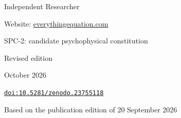 \newtheorem{definition}[theorem]{Definition}
\newtheorem{assumption}[theorem]{Assumption}
\newtheorem{example}[theorem]{Example}
\newtheorem{constitution}[theorem]{Constitutive law}
\theoremstyle{remark}
\newtheorem{remark}[theorem]{Remark}
\newcommand{\R}{\mathbb R}
\newcommand{\C}{\mathbb C}
\newcommand{\N}{\mathbb N}
\newcommand{\E}{\mathbb E}
\newcommand{\HH}{\mathcal H}
\newcommand{\BB}{\mathcal B}
\newcommand{\PP}{\mathcal P}
\newcommand{\ZZ}{\mathcal Z}
\newcommand{\id}{\mathrm{id}}
\newcommand{\dd}{\,\mathrm d}
\newcommand{\TV}{d_{\mathrm{TV}}}
\newcommand{\tr}{\operatorname{tr}}
\newcommand{\supp}{\operatorname{supp}}
\newcommand{\rank}{\operatorname{rank}}
\newcommand{\im}{\operatorname{im}}
\newcommand{\Fix}{\operatorname{Fix}}
\newcommand{\Spec}{\operatorname{Spec}}
\newcommand{\Law}{\operatorname{Law}}
\newcommand{\Var}{\operatorname{Var}}
\newcommand{\osc}{\operatorname{osc}}
\newcommand{\diag}{\operatorname{diag}}
\newcommand{\Span}{\operatorname{span}}
\newcommand{\SCC}{\operatorname{SCC}}
\newcommand{\ket}[1]{\lvert #1\rangle}
\newcommand{\bra}[1]{\langle #1\rvert}
\newcommand{\ip}[2]{\langle #1,#2\rangle}
\newcommand{\norm}[1]{\lVert #1\rVert}
\newcommand{\abs}[1]{\lvert #1\rvert}
\newcommand{\status}[1]{\par\noindent\textit{Status: #1.}\par}
\newcommand{\doi}[1]{\href{https://doi.org/#1}{\nolinkurl{doi:#1}}}
\newcommand{\spctwo}{\textsf{SPC-2}}
\newcommand{\spcone}{\textsf{SPC-1}}
\newcommand{\source}{\Omega_{\mathrm{src}}}
\newcommand{\unsplit}{\mathsf{U}}
\newcommand{\one}{\mathbf 1}

\frontmatter
\hypersetup{pageanchor=false}
\begin{titlepage}
\vspace*{16mm}
\par
\vspace{23mm}
\par
\vspace{12mm}
\par
\vspace{14mm}
\par
\vfill
\noindent Independent Researcher\par
\noindent Website: \href{https://everythingequation.com}{everythingequation.com}\par
\noindent SPC-2: candidate psychophysical constitution\par
\noindent Revised edition\par
{} October 2026\par
\noindent\doi{10.5281/zenodo.23755118}\par
\noindent Based on the publication edition of 20 September 2026
\end{titlepage}

